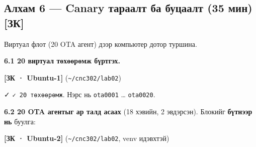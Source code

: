 \hypertarget{ux430ux43bux445ux430ux43c-6-canary-ux442ux430ux440ux430ux430ux43bux442-ux431ux430-ux431ux443ux446ux430ux430ux43bux442-35-ux43cux438ux43d-ux437ux43a}{%
\subsection{Алхам 6 --- Canary тараалт ба буцаалт (35 мин) {[}ЗК{]}}\label{ux430ux43bux445ux430ux43c-6-canary-ux442ux430ux440ux430ux430ux43bux442-ux431ux430-ux431ux443ux446ux430ux430ux43bux442-35-ux43cux438ux43d-ux437ux43a}}

Виртуал флот (20 OTA агент) дээр компьютер дотор туршина.

\textbf{6.1 20 виртуал төхөөрөмж бүртгэх.}

\textbf{{[}ЗК · Ubuntu-1{]}} (\texttt{\textasciitilde{}/cnc302/lab02})

\begin{Shaded}
\begin{Highlighting}[]
\end{Highlighting}
\end{Shaded}

✓ \texttt{✓\ 20\ төхөөрөмж}. Нэрс нь \texttt{ota0001} \ldots{} \texttt{ota0020}.

\textbf{6.2 20 OTA агентыг ар талд асаах} (18 хэвийн, 2 эвдэрсэн). Блокийг \textbf{бүтнээр нь} буулга:

\textbf{{[}ЗК · Ubuntu-2{]}} (\texttt{\textasciitilde{}/cnc302/lab02}, venv идэвхтэй)

\begin{Shaded}
\begin{Highlighting}[]
 \VariableTok{$(}\VariableTok{)}\KeywordTok{;} 
  \KeywordTok{\textbackslash{}}
    \OperatorTok{\textgreater{}}   \KeywordTok{\&}
 \KeywordTok{;} 
  \KeywordTok{\textbackslash{}}
    \OperatorTok{\textgreater{}}   \KeywordTok{\&}
\KeywordTok{;}  \KeywordTok{|} 
\end{Highlighting}
\end{Shaded}

